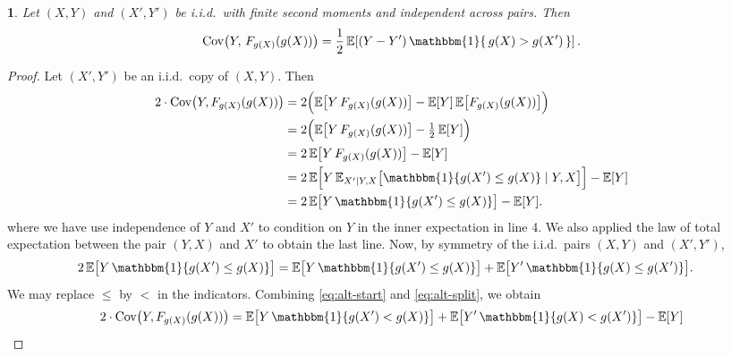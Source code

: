 \documentclass[11pt]{article}
\theoremstyle{plain}
\theoremstyle{plain}
\theoremstyle{plain}
\newtheorem{proposition}{\protect\propositionname}
\theoremstyle{plain}
\theoremstyle{plain}
\theoremstyle{plain}
\theoremstyle{plain}
\newcommand\colorgray[1]{\textcolor{gray}{#1}}
\providecommand{\propositionname}{Proposition}
\begin{document}
\begin{proposition}
\label{equivalent_pairwise_form}
Let $(X,Y)$ and $(X',Y')$ be i.i.d.\ with finite second moments and independent across pairs. Then
\[
\mathrm{Cov}\!\left(Y,\,F_{g(X)}(g(X))\right)
=\frac{1}{2}\,\mathbb{E}\!\left[(Y-Y')\,\mathbbm{1}\{\,g(X)>g(X')\,\}\right].
\]
\end{proposition}
\begin{proof}
Let $(X',Y')$ be an i.i.d.\ copy of $(X,Y)$.  Then %
\begin{align}
    2\cdot\text{Cov}\big(Y, F_{g(X)}(g(X))\big) \notag 
    &= 2\Big( \mathbb{E}\big[Y\, F_{g(X)}(g(X))\big] 
              - \mathbb{E}[Y]\,\mathbb{E}\big[F_{g(X)}(g(X))\big] \Big) \notag \\
    &= 2\Big( \mathbb{E}\big[Y\, F_{g(X)}(g(X))\big] - \tfrac{1}{2}\,\mathbb{E}[Y] \Big) \notag \\
    &= 2\,\mathbb{E}\big[Y\, F_{g(X)}(g(X))\big] - \mathbb{E}[Y] \notag \\
    &= 2\,\mathbb{E}\Big[ Y\, \mathbb{E}_{X'|Y,X}\big[\mathbbm{1}\{g(X') \le g(X)\}\mid Y, X\big]\Big] - \mathbb{E}[Y] \notag \\
    &= 2\,\mathbb{E}\big[ Y\,\mathbbm{1}\{g(X') \le g(X)\} \big] - \mathbb{E}[Y]. \label{eq:alt-start}
\end{align}
where we have use independence of $Y$ and $X'$ to condition on $Y$ in the inner expectation in line 4. We also applied the law of total expectation between the pair $(Y, X)$ and $X'$ to obtain the last line. Now, by symmetry of the i.i.d.\ pairs $(X,Y)$ and $(X',Y')$, 
\begin{align}
    2\,\mathbb{E}\big[ Y\,\mathbbm{1}\{g(X') \le g(X)\} \big]
    &= \mathbb{E}\big[ Y\,\mathbbm{1}\{g(X') \le g(X)\} \big]
     + \mathbb{E}\big[ Y'\,\mathbbm{1}\{g(X) \le g(X')\} \big]. \label{eq:alt-split}
\end{align}
We may replace $\le$ by $<$ in the indicators. Combining
\eqref{eq:alt-start} and \eqref{eq:alt-split}, we obtain
\begin{align}
    2\cdot\text{Cov}\big(Y, F_{g(X)}(g(X))\big)
    &= \mathbb{E}\big[ Y\,\mathbbm{1}\{g(X') < g(X)\} \big]
     + \mathbb{E}\big[ Y'\,\mathbbm{1}\{g(X) < g(X')\} \big]
     - \mathbb{E}[Y] \notag \\

\end{align}
\end{proof}
\end{document}

